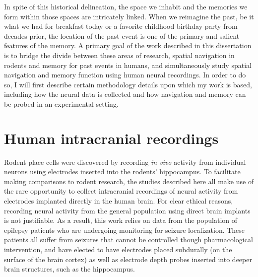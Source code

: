 In spite of this historical delineation, the space we inhabit and the memories we form within those spaces are intricately linked. When we reimagine the past, be it what we had for breakfast today or a favorite childhood birthday party from decades prior, the location of the past event is one of the primary and salient features of the memory. A primary goal of the work described in this dissertation is to bridge the divide between these areas of research, spatial navigation in rodents and memory for past events in humans, and simultaneously study spatial navigation and memory function using human neural recordings. In order to do so, I will first describe certain methodology details upon which my work is based, including how the neural data is collected and how navigation and memory can be probed in an experimental setting.









\section{Human intracranial recordings}

Rodent place cells were discovered by recording \textit{in vivo} activity from individual neurons using electrodes inserted into the rodents' hippocampus. To facilitate making comparisons to rodent research, the studies described here all make use of the rare opportunity to collect intracranial recordings of neural activity from electrodes implanted directly in the human brain. For clear ethical reasons, recording neural activity from the general population using direct brain implants is not justifiable. As a result, this work relies on data from the population of epilepsy patients who are undergoing monitoring for seizure localization. These patients all suffer from seizures that cannot be controlled though pharmacological intervention, and have elected to have electrodes placed subdurally (on the surface of the brain cortex) as well as electrode depth probes inserted into deeper brain structures, such as the hippocampus.


